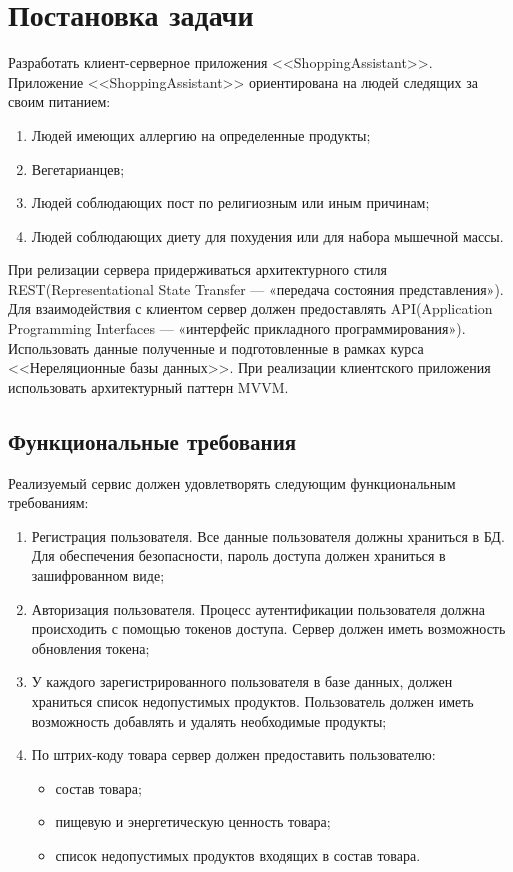 \section{Постановка задачи}


Разработать клиент-серверное приложения <<ShoppingAssistant>>.
Приложение <<ShoppingAssistant>> ориентирована на людей следящих за
своим питанием:
\begin{enumerate}
	\item Людей имеющих аллергию на определенные продукты;
	\item Вегетарианцев;
	\item Людей соблюдающих пост по религиозным или иным причинам;
	\item Людей соблюдающих диету для похудения или для набора мышечной массы.
\end{enumerate}


При релизации сервера придерживаться архитектурного стиля REST(Representational State Transfer — «передача состояния представления»). Для взаимодействия с клиентом сервер должен предоставлять API(Application Programming Interfaces  — «интерфейс прикладного программирования»). Использовать данные полученные и подготовленные в рамках курса <<Нереляционные базы данных>>.
При реализации клиентского приложения использовать архитектурный паттерн MVVM.


\subsection{Функциональные требования}
Реализуемый сервис должен удовлетворять следующим функциональным требованиям:
\begin{enumerate}
	\item Регистрация пользователя. Все данные пользователя должны храниться в БД. Для обеспечения безопасности, пароль доступа должен храниться в зашифрованном виде;
	\item Авторизация пользователя. Процесс аутентификации пользователя должна происходить с помощью токенов доступа. Сервер должен иметь возможность обновления токена;
	\item У каждого зарегистрированного пользователя в базе данных, должен храниться список недопустимых продуктов. Пользователь должен иметь возможность добавлять и удалять необходимые продукты;
	\item По штрих-коду товара сервер должен предоставить пользователю:
	 \begin{itemize}
	 	\item состав товара;
	 	\item пищевую и энергетическую ценность товара;
	 	\item список недопустимых продуктов входящих в состав товара. 
	\end{itemize}
\end{enumerate}

